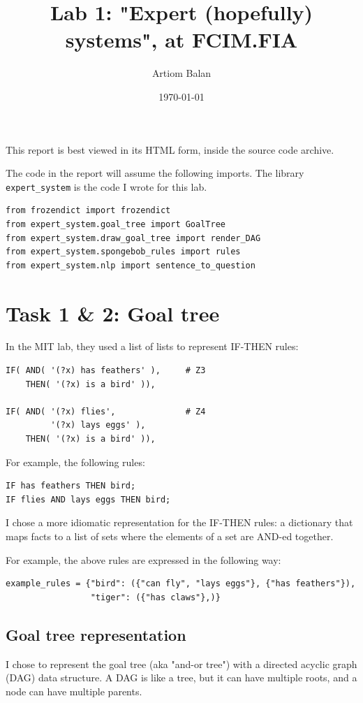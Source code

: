\documentclass[11pt]{article}
\author{Artiom Balan}
\date{\today}
\title{Lab 1: "Expert (hopefully) systems", at FCIM.FIA}
\begin{document}
\maketitle
\tableofcontents

This report is best viewed in its HTML form, inside the source code archive.


The code in the report will assume the following imports.
The library \texttt{expert\_system} is the code I wrote for this lab.
\begin{verbatim}
from frozendict import frozendict
from expert_system.goal_tree import GoalTree
from expert_system.draw_goal_tree import render_DAG
from expert_system.spongebob_rules import rules
from expert_system.nlp import sentence_to_question
\end{verbatim}

\section{Task 1 \& 2: Goal tree}
\label{sec:orga8fd6e8}

In the MIT lab, they used a list of lists to represent IF-THEN rules:
\begin{verbatim}
IF( AND( '(?x) has feathers' ),     # Z3
    THEN( '(?x) is a bird' )),

IF( AND( '(?x) flies',              # Z4
         '(?x) lays eggs' ),
    THEN( '(?x) is a bird' )),
\end{verbatim}

For example, the following rules:
\begin{verbatim}
IF has feathers THEN bird;
IF flies AND lays eggs THEN bird;
\end{verbatim}

I chose a more idiomatic representation for the IF-THEN rules:
a dictionary that maps facts to a list of sets
where the elements of a set are AND-ed together.

For example, the above rules are expressed in the following way:
\begin{verbatim}
example_rules = {"bird": ({"can fly", "lays eggs"}, {"has feathers"}),
                 "tiger": ({"has claws"},)}
\end{verbatim}


\subsection{Goal tree representation}
\label{sec:orgdfba828}

I chose to represent the goal tree (aka "and-or tree")
with a directed acyclic graph (DAG) data structure.
A DAG is like a tree, but it can have multiple roots,
and a node can have multiple parents.
\end{document}
